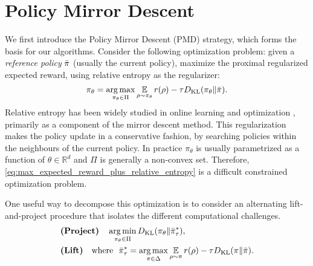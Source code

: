 
\section{Policy Mirror Descent}
\label{subsec:revisitTRPO}

\newcommand{\real}{\mathbb{R}}


We first introduce the Policy Mirror Descent (PMD) strategy,
which forms the basis for our algorithms.
Consider the following optimization problem:
given a \emph{reference policy} $\bar{\pi}$ (usually the current policy), 
maximize the proximal regularized expected reward,
using relative entropy as the regularizer:
\begin{equation}
\label{eq:max_expected_reward_plus_relative_entropy}
\pi_{\theta} = \operatorname*{arg\,max}\limits_{\pi_\theta \in \Pi} { \operatorname*{\mathbb{E}}\limits_{\rho \sim \pi_\theta}{  r(\rho)  - \tau D_{\mathrm{KL}}(\pi_\theta \| \bar{\pi}) } }.
\end{equation}
Relative entropy has been widely studied in
online learning and optimization
\citep{nemirovskii1983problem,beck2003mirror},
primarily as a component of the mirror descent method. This regularization makes the policy update in a
conservative fashion, by searching policies within the neighbours of the current policy. 
In practice
$\pi_\theta$ is usually parametrized as a
function of $\theta \in \real^d$ and
$\Pi$ is generally a non-convex set.
Therefore, 
\cref{eq:max_expected_reward_plus_relative_entropy}
is a difficult constrained optimization problem.

One useful way to decompose this optimization
is to consider an alternating lift-and-project procedure
that isolates the different computational challenges.
%
{\small
\begin{equation}
\label{eq:pmd}
\begin{aligned}
&\text{\bf (Project)} \quad \operatorname*{arg\,min}\limits_{\pi_\theta \in \Pi}{D_{\mathrm{KL}}( \pi_\theta \| \bar{\pi}_{\tau}^* )}, \\
&\text{\bf (Lift)}  \quad  \text{where}\ \ \bar{\pi}_{\tau}^* =  \operatorname*{arg\,max}\limits_{\pi \in \Delta}{ \operatorname*{\mathbb{E}}\limits_{\rho \sim \pi}{  r(\rho)  - \tau D_{\mathrm{KL}}(\pi \| \bar{\pi}) } }.
\end{aligned}
\end{equation}
}
%


